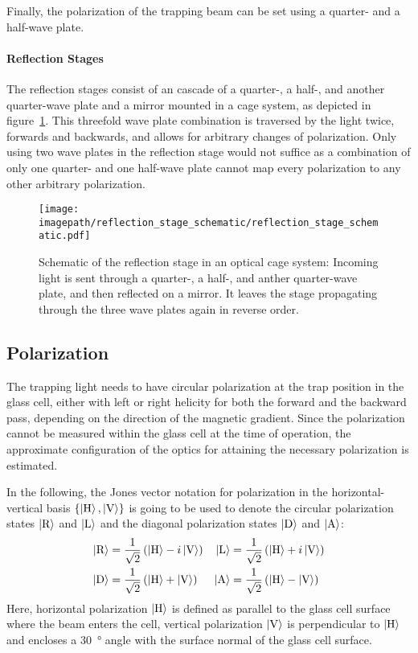 Finally, the polarization of the trapping beam can be set using a quarter- and a half-wave plate.

\paragraph{Reflection Stages}
The reflection stages consist of an cascade of a quarter-, a half-, and another quarter-wave plate and a mirror mounted in a cage system, as depicted in figure~\ref{fig:reflection_stage_schematic}. This threefold wave plate combination is traversed by the light twice, forwards and backwards, and allows for arbitrary changes of polarization. Only using two wave plates in the reflection stage would not suffice as a combination of only one quarter- and one half-wave plate cannot map every polarization to any other arbitrary polarization.

\begin{figure}
    \centering
    \texttt{[image: \\imagepath/reflection\_stage\_schematic/reflection\_stage\_schematic.pdf]}
    \caption{Schematic of the reflection stage in an optical cage system: Incoming light is sent through a quarter-, a half-, and anther quarter-wave plate, and then reflected on a mirror. It leaves the stage propagating through the three wave plates again in reverse order.}
    \label{fig:reflection_stage_schematic}
\end{figure}

\subsection*{Polarization}
The trapping light needs to have circular polarization at the trap position in the glass cell, either with left or right helicity for both the forward and the backward pass, depending on the direction of the magnetic gradient. Since the polarization cannot be measured within the glass cell at the time of operation, the approximate configuration of the optics for attaining the necessary polarization is estimated.

In the following, the Jones vector notation for polarization in the horizontal-vertical basis $\{\Ket{\text{H}}, \Ket{\text{V}}\}$ is going to be used to denote the circular polarization states $\Ket{\text{R}}$ and $\Ket{\text{L}}$ and the diagonal polarization states $\Ket{\text{D}}$ and $\Ket{\text{A}}$:
\begin{align}
        \Ket{\text{R}} &= \frac{1}{\sqrt{2}} \left(\Ket{\text{H}} - i \Ket{\text{V}}\right)  & \Ket{\text{L}} &= \frac{1}{\sqrt{2}} \left(\Ket{\text{H}} + i \Ket{\text{V}}\right) \\
        \Ket{\text{D}} &= \frac{1}{\sqrt{2}} \left(\Ket{\text{H}} + \Ket{\text{V}}\right)  &  \Ket{\text{A}} &= \frac{1}{\sqrt{2}} \left(\Ket{\text{H}} - \Ket{\text{V}}\right)
\end{align}
Here, horizontal polarization $\Ket{\text{H}}$ is defined as parallel to the glass cell surface  where the beam enters the cell, vertical polarization $\Ket{\text{V}}$ is perpendicular to $\Ket{\text{H}}$ and encloses a \SI{30}{\degree} angle with the surface normal of the glass cell surface.

